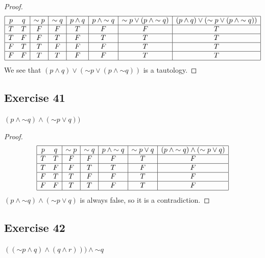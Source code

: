 \documentclass[14pt]{extarticle}
\begin{document}
\begin{proof} 
$$ 
\begin{array}{|cc|c|c|c|c|c|c|} 
\hline 
p & q & {\sim p} & {\sim q} & p \wedge q & p \wedge {\sim q} & {\sim p} \vee (p \wedge {\sim q}) & (p \wedge q) \vee ({\sim p} \vee (p \wedge {\sim q})) \\ 
\hline 
T & T & F & F & T & F & F & T \\ 
\hline 
T & F & F & T & F & T & T & T \\ 
\hline 
F & T & T & F & F & F & T & T \\ 
\hline 
F & F & T & T & F & F & T & T \\ 
\hline 
\end{array} 
$$ 
We see that $(p \wedge q) \vee ({\sim p} \vee (p \wedge {\sim q}))$ is a tautology.
\end{proof}

\subsection{Exercise 41} 
$(p \wedge {\sim q}) \wedge ({\sim p} \vee q))$

\begin{proof} 
$$ 
\begin{array}{|cc|c|c|c|c|c|} 
\hline 
p & q & {\sim p} & {\sim q} & p \wedge {\sim q} & {\sim p} \vee q & (p \wedge {\sim q}) \wedge ({\sim p} \vee q) \\ 
\hline 
T & T & F & F & F & T & F \\ 
\hline 
T & F & F & T & T & F & F \\ 
\hline 
F & T & T & F & F & T & F \\ 
\hline 
F & F & T & T & F & T & F \\
\hline 
\end{array} 
$$ 
$(p \wedge {\sim q}) \wedge ({\sim p} \vee q)$ is always false, so it is a contradiction.
\end{proof} 

\subsection{Exercise 42} $(({\sim p} \wedge q) \wedge (q \wedge r))) \wedge
{\sim q}$
\end{document}
